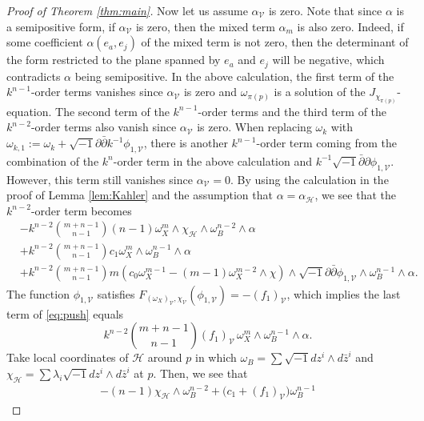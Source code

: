 \documentclass{amsart}
\numberwithin{equation}{section}
\theoremstyle{plain}
\theoremstyle{definition}
\theoremstyle{remark}
\begin{document}
\begin{proof}[Proof of Theorem \ref{thm:main}]
    Now let us assume $\alpha_{\mathcal{V}}$ is zero. Note that since $\alpha$ is a semipositive form, if $\alpha_{\mathcal{V}}$ is zero, then the mixed term $\alpha_m$ is also zero. Indeed, if some coefficient  $\alpha(e_a,e_j)$ of the mixed term is not zero, then the determinant of the form restricted to the plane spanned by $e_a$ and $e_j$ will be negative, which contradicts $\alpha$ being semipositive. 
    In the above calculation, the first term of the $k^{n-1}$-order terms vanishes since $\alpha_\mathcal{V}$ is zero and $\omega_{\pi(p)}$ is a solution of the $J_{\chi_{\pi(p)}}$-equation. The second term of the $k^{n-1}$-order terms and the third term of the $k^{n-2}$-order terms also vanish since $\alpha_{\mathcal{V}}$ is zero. 
    When replacing $\omega_{k}$ with $\omega_{k,1}:=\omega_k+\sqrt{-1}\partial\bar{\partial}k^{-1}\phi_{1,\mathcal{V}}$, there is another $k^{n-1}$-order term coming from the combination of the $k^n$-order term in the above calculation and $k^{-1}\sqrt{-1}\bar{\partial}\partial\phi_{1,\mathcal{V}}$. However, this term still vanishes since $\alpha_\mathcal{V}=0$.
    By using the calculation in the proof of Lemma \ref{lem:Kahler} and the assumption that $\alpha=\alpha_{\mathcal{H}}$, we see that the $k^{n-2}$-order term becomes
    \begin{equation}\label{eq:push}
    \begin{split}
        &-k^{n-2}{m+n-1\choose n-1}(n-1)\omega_X^{m}\wedge\chi_{\mathcal{H}}\wedge\omega_B^{n-2}\wedge\alpha\\
        &+k^{n-2}{{m+n-1}\choose n-1}c_1 \omega_X^{m}\wedge\omega_B^{n-1}\wedge\alpha\\
        &+k^{n-2}{m+n-1\choose n-1}m\left( c_0\omega_X^{m-1}-(m-1)\omega_X^{m-2}\wedge\chi\right)\wedge\sqrt{-1}\partial\bar{\partial}\phi_{1,\mathcal{V}}\wedge\omega_B^{n-1}\wedge\alpha.
    \end{split}
    \end{equation}
    The function $\phi_{1,\mathcal{V}}$ satisfies $F_{(\omega_{X})_\mathcal{V},\chi_{\mathcal{V}}}(\phi_{1,\mathcal{V}})=-(f_1)_{\mathcal{V}}$, which implies the last term of \eqref{eq:push} equals 
    $$k^{n-2}{m+n-1\choose n-1}(f_1)_{\mathcal{V}}\, \omega_X^m\wedge\omega_B^{n-1}\wedge\alpha.$$ 
    Take local coordinates of $\mathcal{H}$ around $p$  
    in which $\omega_B=\sum\sqrt{-1}dz^i\wedge d\bar{z}^i$ and $\chi_{\mathcal{H}}=\sum\lambda_i\sqrt{-1}dz^i\wedge d\bar{z}^i$ at $p$. 
    Then, we see that
    \begin{align*}
        -(n-1)\chi_{\mathcal{H}}\wedge\omega_B^{n-2}+\big(c_1+(f_1)_{\mathcal{V}}\big)\omega_B^{n-1}

\end{align*}
\end{proof}
\end{document}
